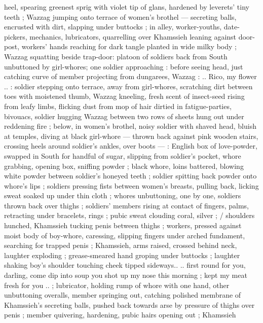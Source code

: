\documentclass[10pt,twoside]{memoir}
\begin{document}
heel, spearing greenest sprig with violet tip of glans, hardened by 
leverets' tiny teeth ; Wazzag jumping onto terrace of women's 
brothel --- secreting balls, encrusted with dirt, slapping under 
buttocks ; in alley, worker-youths, date-pickers, mechanics, 
lubricators, quarrelling over Khamssieh leaning against door-post, 
workers' hands reaching for dark tangle planted in wide milky body 
; Wazzag squatting beside trap-door: platoon of soldiers back from 
South unbuttoned by girl-whores; one soldier approaching : before 
seeing head, just catching curve of member projecting from 
dungarees, Wazzag : .. {\guillemotleft} Rico, my flower .. {\guillemotright} : soldier stepping onto 
terrace, away from girl-whores, scratching dirt between toes with 
moistened thumb, Wazzag kneeling, fresh scent of insect-seed rising 
from leafy limbs, flicking dust from mop of hair dirtied in fatigue-parties,
bivouacs, soldier hugging Wazzag between two rows of 
sheets hung out under reddening fire ; below, in women's brothel, %
noisy soldier with shaved head, bluish at temples, diving at black girl-whore 
--- thrown back against pink wooden stairs, crossing heels 
around soldier's ankles, over boots --- : English box of love-powder, 
swapped in South for handful of sugar, slipping from soldier's 
pocket, whore grabbing, opening box, sniffing powder ; black whore, 
loins battered, blowing white powder between soldier's honeyed 
teeth ; soldier spitting back powder onto whore's lips ; soldiers 
pressing fists between women's breasts, pulling back, licking sweat 
soaked up under thin cloth ; whores unbuttoning, one by one, 
soldiers thrown back over thighs ; soldiers' members rising at contact
of fingers, palms, retracting under bracelets, rings ; pubic sweat 
clouding coral, silver ; / shoulders hunched, Khamssieh tucking penis 
between thighs ; workers, pressed against moist body of boy-whore, 
caressing, slipping fingers under arched fundament, searching for 
trapped penis ; Khamssieh, arms raised, crossed behind neck, 
laughter exploding ; grease-smeared hand groping under buttocks ; 
laughter shaking boy's shoulder touching cheek tipped sideways.. {\guillemotleft}..
first round for you, darling, come dip into soup you shot up my nose 
this morning ; kept my meat fresh for you .. {\guillemotright} ; lubricator, holding 
rump of whore with one hand, other unbuttoning overalls, member 
springing out, catching polished membrane of Khamssieh's secreting 
balls, pushed back towards arse by pressure of thighs over penis ; 
member quivering, hardening, pubic hairs opening out ; Khamssieh 
\end{document}
